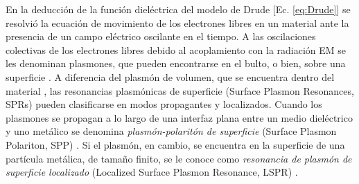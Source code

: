 En la deducción de la función dieléctrica del modelo de Drude [Ec. \eqref{eq:Drude}] se resolvió la ecuación de movimiento de los electrones libres en un material ante la  presencia de un campo eléctrico oscilante en el tiempo. A las oscilaciones colectivas  de los electrones libres debido al acoplamiento con la radiación EM se les denominan  plasmones, que pueden encontrarse en el bulto, o bien, sobre una superficie \cite{stockman2011nanoplasmonics}. A diferencia del plasmón de volumen, que se encuentra dentro del material \cite{maier2007plasmonics}, las resonancias plasmónicas de superficie (Surface Plasmon Resonances, SPRs) pueden clasificarse en modos propagantes y localizados. Cuando los plasmones se propagan a lo largo de una interfaz plana entre un medio diel\'ectrico y uno met\'alico se denomina  \emph{plasm\'on-polarit\'on de superficie} (Surface Plasmon Polariton, SPP) \cite{maier2007plasmonics}.  Si el plasmón, en cambio, se encuentra en la superficie de una partícula  met\'alica, de tamaño finito, se le conoce como \emph{resonancia de plasm\'on de superficie localizado} (Localized Surface Plasmon Resonance, LSPR) \cite{maier2007plasmonics}. 

